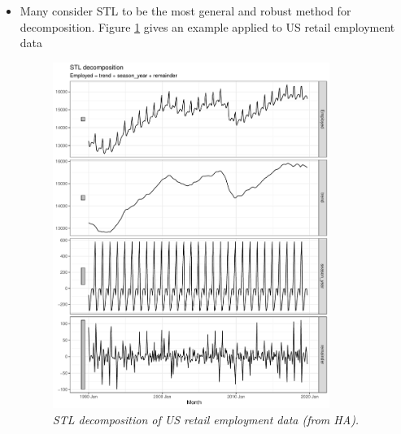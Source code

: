 \documentclass{article}
\begin{document}
\begin{itemize}
\item Many consider STL to be the most general and robust method for
  decomposition. Figure \ref{fig:stl} gives an example applied to US retail
  employment data 

\begin{figure}[p]
\centering
\includegraphics[width=0.85\textwidth]{fig/stl-1.pdf}
\caption{\it STL decomposition of US retail employment data (from HA).}  
\label{fig:stl}
\end{figure}
\end{itemize}
\end{document}
